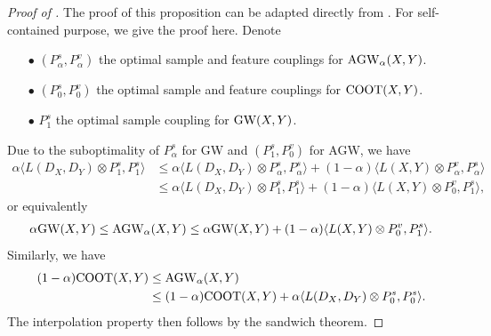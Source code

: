 \begin{proof}[Proof of ]
  The proof of this proposition can be adapted directly from \citep{Vayer19b}.
  For self-contained purpose, we give the proof here. Denote
  \begin{itemize}
      \item[$\bullet$] $(P^s_{\alpha}, P^v_{\alpha})$ the optimal sample and feature couplings for
      $\text{AGW}_{\alpha}(X, Y)$.

      \item[$\bullet$] $(P^s_0, P^v_0)$ the optimal sample and feature couplings for $\text{COOT}(X, Y)$.

      \item[$\bullet$] $P^s_1$ the optimal sample coupling for $\text{GW}(X, Y)$.
  \end{itemize}
  Due to the suboptimality of $P^s_{\alpha}$ for GW and $(P^s_1, P^v_0)$ for AGW, we have
  \begin{align}
      \alpha \langle L(D_X, D_Y) \otimes P^s_1, P^s_1 \rangle
      &\leq \alpha \langle L(D_X, D_Y) \otimes P^s_{\alpha}, P^s_{\alpha} \rangle
      + (1 - \alpha) \langle L(X, Y) \otimes P^v_{\alpha}, P^s_{\alpha} \rangle \\
      &\leq \alpha \langle L(D_X, D_Y) \otimes P^s_1, P^s_1 \rangle
      + (1 - \alpha) \langle L(X, Y) \otimes P^v_0, P^s_1 \rangle,
  \end{align}
  or equivalently
  \begin{align}
      \alpha \text{GW}(X, Y) \leq \text{AGW}_{\alpha}(X, Y) \leq \alpha \text{GW}(X, Y)
      + (1 - \alpha) \langle L(X, Y) \otimes P^v_0, P^s_1 \rangle.
  \end{align}
  Similarly, we have
  \begin{align}
      (1 - \alpha) \text{COOT}(X, Y) &\leq \text{AGW}_{\alpha}(X, Y) \\
      &\leq (1 - \alpha) \text{COOT}(X, Y) + \alpha \langle L(D_X, D_Y) \otimes P^s_0, P^s_0 \rangle.
  \end{align}
  The interpolation property then follows by the sandwich theorem.


\end{proof}
